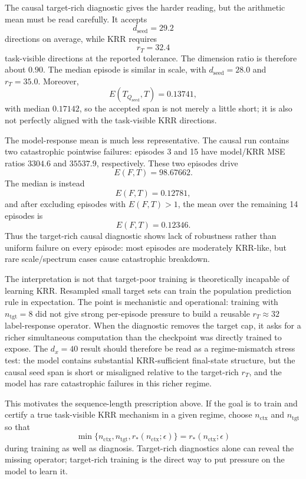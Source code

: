 \documentclass[11pt]{article}
\begin{document}
The causal target-rich diagnostic gives the harder reading, but the arithmetic mean must be read
carefully. It accepts
\[
d_{\mathrm{seed}}=29.2
\]
directions on average, while KRR requires
\[
r_T=32.4
\]
task-visible directions at the reported tolerance. The dimension ratio is therefore about \(0.90\).
The median episode is similar in scale, with \(d_{\mathrm{seed}}=28.0\) and \(r_T=35.0\). Moreover,
\[
E(T_{Q_{\mathrm{seed}}},T)=0.13741,
\]
with median \(0.17142\), so the accepted span is not merely a little short; it is also not perfectly
aligned with the task-visible KRR directions.

The model-response mean is much less representative. The causal run contains two catastrophic
pointwise failures: episodes 3 and 15 have model/KRR MSE ratios \(3304.6\) and \(35537.9\),
respectively. These two episodes drive
\[
E(F,T)=98.67662.
\]
The median is instead
\[
E(F,T)=0.12781,
\]
and after excluding episodes with \(E(F,T)>1\), the mean over the remaining 14 episodes is
\[
E(F,T)=0.12346.
\]
Thus the target-rich causal diagnostic shows lack of robustness rather than uniform failure on every
episode: most episodes are moderately KRR-like, but rare scale/spectrum cases cause catastrophic
breakdown.

The interpretation is not that target-poor training is theoretically incapable of learning KRR.
Resampled small target sets can train the population prediction rule in expectation. The point is
mechanistic and operational: training with \(n_{\mathrm{tgt}}=8\) did not give strong per-episode
pressure to build a reusable \(r_T\approx32\) label-response operator. When the diagnostic removes
the target cap, it asks for a richer simultaneous computation than the checkpoint was directly
trained to expose. The \(d_x=40\) result should therefore be read as a regime-mismatch stress test:
the model contains substantial KRR-sufficient final-state structure, but the causal seed span is
short or misaligned relative to the target-rich \(r_T\), and the model has rare catastrophic failures
in this richer regime.

This motivates the sequence-length prescription above. If the goal is to train and certify a true
task-visible KRR mechanism in a given regime, choose \(n_{\mathrm{ctx}}\) and \(n_{\mathrm{tgt}}\) so that
\[
\min\{n_{\mathrm{ctx}},n_{\mathrm{tgt}},r_*(n_{\mathrm{ctx}};\epsilon)\}
=r_*(n_{\mathrm{ctx}};\epsilon)
\]
during training as well as diagnosis. Target-rich diagnostics alone can reveal the missing operator;
target-rich training is the direct way to put pressure on the model to learn it.
\end{document}
